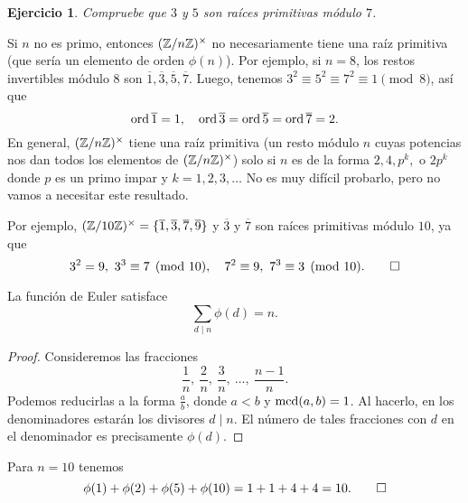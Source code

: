 \documentclass{article}
\theoremstyle{plain}
\newtheorem{ejerc}{Ejercicio}
\begin{document}
\begin{ejerc}
  Compruebe que $3$ y $5$ son raíces primitivas módulo $7$.
\end{ejerc}

\begin{ejemplo}
  Si $n$ no es primo, entonces $(\mathbb{Z}/n\mathbb{Z})^\times$ no necesariamente tiene una
  raíz primitiva (que sería un elemento de orden $\phi (n)$). Por ejemplo, si
  $n = 8$, los restos invertibles módulo $8$ son
  $\overline{1}, \overline{3}, \overline{5}, \overline{7}$. Luego, tenemos
  $3^2 \equiv 5^2 \equiv 7^2 \equiv 1 \pmod{8}$, así que
  $$\operatorname{ord} \overline{1} = 1, \quad \operatorname{ord} \overline{3} = \operatorname{ord} \overline{5} = \operatorname{ord} \overline{7} = 2.$$
  En general, $(\mathbb{Z}/n\mathbb{Z})^\times$ tiene una raíz primitiva (un resto módulo $n$
  cuyas potencias nos dan todos los elementos de $(\mathbb{Z}/n\mathbb{Z})^\times$) solo si
  $n$ es de la forma $2, 4, p^k, \text{ o } 2p^k$ donde $p$ es un primo impar y
  $k=1,2,3,\ldots$ No es muy difícil probarlo, pero no vamos a necesitar este
  resultado.

  Por ejemplo,
  $(\mathbb{Z}/10\mathbb{Z})^\times = \{ \overline{1}, \overline{3}, \overline{7},
  \overline{9} \}$ y $\overline{3}$ y $\overline{7}$ son raíces primitivas
  módulo $10$, ya que
  \[ 3^2 = 9, ~ 3^3 \equiv 7 \pmod{10}, \quad
     7^2 \equiv 9, ~ 7^3 \equiv 3 \pmod{10}. \qedhere \]
\end{ejemplo}

\begin{lema}
  La función de Euler satisface
  $$\sum_{d\mid n} \phi (d) = n.$$

\begin{proof}
  Consideremos las fracciones
  $$\frac{1}{n}, ~ \frac{2}{n}, ~ \frac{3}{n}, ~ \ldots, ~ \frac{n-1}{n}.$$
  Podemos reducirlas a la forma $\frac{a}{b}$, donde $a < b$ y
  $\operatorname{mcd} (a,b) = 1$. Al hacerlo, en los denominadores estarán los divisores
  $d\mid n$. El número de tales fracciones con $d$ en el denominador es
  precisamente $\phi (d)$.
\end{proof}
\end{lema}

\begin{ejemplo}
  Para $n = 10$ tenemos
  \[ \phi (1) + \phi (2) + \phi (5) + \phi (10)
       = 1 + 1 + 4 + 4 = 10. \qedhere \]
\end{ejemplo}
\end{document}
